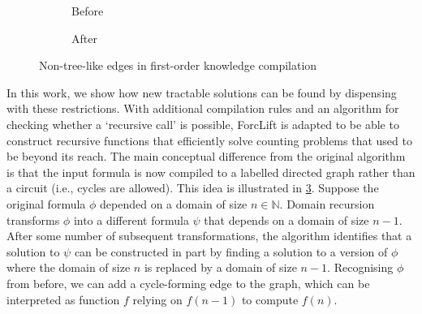 \begin{figure}
  \centering
  \begin{subfigure}{0.49\textwidth}
    \caption{Before}
    \label{fig:before}
  \end{subfigure}
  \begin{subfigure}{0.49\textwidth}
    \centering
    \caption{After}
    \label{fig:after}
  \end{subfigure}
  \caption{Non-tree-like edges in first-order knowledge compilation}
\end{figure}



In this work, we show how new tractable solutions can be found by dispensing
with these restrictions. With additional compilation rules and an algorithm for
checking whether a `recursive call' is possible, ForcLift
\citep{DBLP:conf/ijcai/BroeckTMDR11} is adapted to be able to construct
recursive functions that efficiently solve counting problems that used to be
beyond its reach. The main conceptual difference from the original algorithm is
that the input formula is now compiled to a labelled directed graph rather than
a circuit (i.e., cycles are allowed). This idea is illustrated in
\cref{fig:after}. Suppose the original formula $\phi$ depended on a domain of
size $n \in \mathbb{N}$. Domain recursion transforms $\phi$ into a different
formula $\psi$ that depends on a domain of size $n-1$. After some number of
subsequent transformations, the algorithm identifies that a solution to $\psi$
can be constructed in part by finding a solution to a version of $\phi$ where
the domain of size $n$ is replaced by a domain of size $n-1$. Recognising $\phi$
from before, we can add a cycle-forming edge to the graph, which can be
interpreted as function $f$ relying on $f(n-1)$ to compute $f(n)$.

